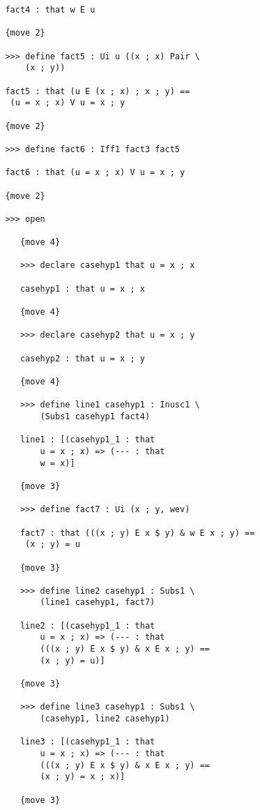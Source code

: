\documentclass[12pt]{article}
\begin{document}
\begin{verbatim}
         fact4 : that w E u

         {move 2}

         >>> define fact5 : Ui u ((x ; x) Pair \
             (x ; y))

         fact5 : that (u E (x ; x) ; x ; y) == 
          (u = x ; x) V u = x ; y

         {move 2}

         >>> define fact6 : Iff1 fact3 fact5

         fact6 : that (u = x ; x) V u = x ; y

         {move 2}

         >>> open

            {move 4}

            >>> declare casehyp1 that u = x ; x

            casehyp1 : that u = x ; x

            {move 4}

            >>> declare casehyp2 that u = x ; y

            casehyp2 : that u = x ; y

            {move 4}

            >>> define line1 casehyp1 : Inusc1 \
                (Subs1 casehyp1 fact4)

            line1 : [(casehyp1_1 : that 
                u = x ; x) => (--- : that 
                w = x)]

            {move 3}

            >>> define fact7 : Ui (x ; y, wev)

            fact7 : that (((x ; y) E x $ y) & w E x ; y) == 
             (x ; y) = u

            {move 3}

            >>> define line2 casehyp1 : Subs1 \
                (line1 casehyp1, fact7)

            line2 : [(casehyp1_1 : that 
                u = x ; x) => (--- : that 
                (((x ; y) E x $ y) & x E x ; y) == 
                (x ; y) = u)]

            {move 3}

            >>> define line3 casehyp1 : Subs1 \
                (casehyp1, line2 casehyp1)

            line3 : [(casehyp1_1 : that 
                u = x ; x) => (--- : that 
                (((x ; y) E x $ y) & x E x ; y) == 
                (x ; y) = x ; x)]

            {move 3}


\end{verbatim}
\end{document}
